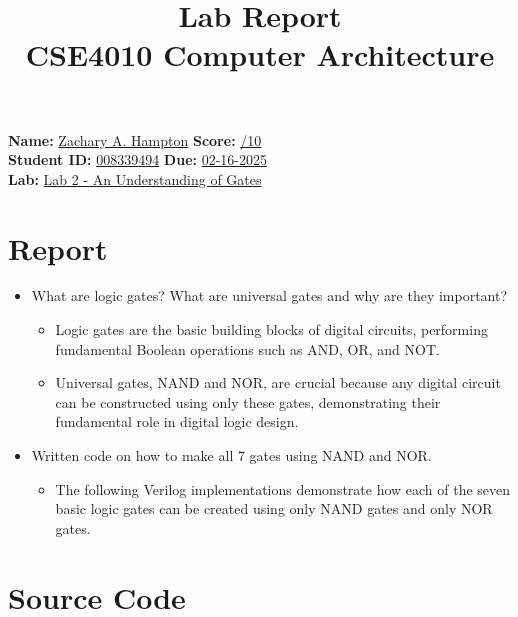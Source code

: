 \documentclass[a4paper,12pt]{article}
\title{Lab Report\\ CSE4010 Computer Architecture}
\author{}
\date{}
\begin{document}
\maketitle

\noindent \textbf{Name:} \underline{Zachary A. Hampton\hspace{5cm}} \hfill \textbf{Score:} \underline{\hspace{2cm}/10} \\
\textbf{Student ID:} \underline{008339494\hspace{6cm}} \hfill \textbf{Due:} \underline{02-16-2025} \\
\textbf{Lab:} \underline{Lab 2 - An Understanding of Gates\hspace{6cm}}

\section*{Report}
\begin{itemize}
    \item What are logic gates? What are universal gates and why are they important?
    \begin{itemize}
        \item Logic gates are the basic building blocks of digital circuits, performing fundamental Boolean operations such as AND, OR, and NOT.
        \item Universal gates, NAND and NOR, are crucial because any digital circuit can be constructed using only these gates, demonstrating their fundamental role in digital logic design.
    \end{itemize}
    \item Written code on how to make all 7 gates using NAND and NOR.
    \begin{itemize}
        \item The following Verilog implementations demonstrate how each of the seven basic logic gates can be created using only NAND gates and only NOR gates.
    \end{itemize}
\end{itemize}

\newpage

\section*{Source Code}
\end{document}
